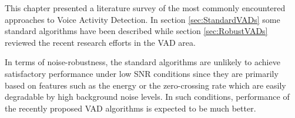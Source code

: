 This chapter presented a literature survey of the most commonly encountered approaches to Voice Activity Detection. In section \ref{sec:StandardVADs} some standard algorithms have been described while section \ref{sec:RobustVADs} reviewed the recent research efforts in the VAD area.

In terms of noise-robustness, the standard algorithms are unlikely to achieve satisfactory performance under low SNR conditions since they are primarily based on features such as the energy or the zero-crossing rate which are easily degradable by high background noise levels. In such conditions, performance of the recently proposed VAD algorithms is expected to be much better.